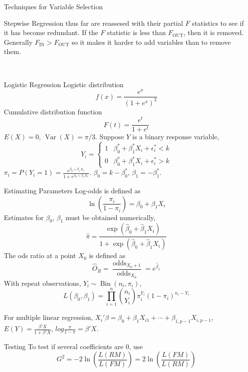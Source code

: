 \documentclass{article}
\DeclareMathOperator{\Var}{Var}
\DeclareMathOperator{\Bin}{Bin}
\DeclareMathOperator{\fin}{IN}
\DeclareMathOperator{\fout}{OUT}
\DeclareMathOperator{\odds}{odds}
\begin{document}
\begin{multicols*}{3}
\begin{blackbox}{Techniques for Variable Selection}
\begin{pinkbox}{Stepwise Regression}
                thus far are reassesed with their partial $F$ statistics to see if it has become redundant. If the $F$ statistic is less than $F_{\fout}$, then it is removed. Generally $F_{\fin} > F_{\fout}$ so it makes it harder to add variables than to remove them.
            \end{pinkbox}\\[-2ex]
        \end{blackbox}
        \begin{blackbox}{Logistic Regression}
            Logistic distribution
            \[f(x) = \frac{e^x}{(1+e^{x})^2}\]            
            Cumulative distribution function
            \[F(t) = \frac{e^t}{1+e^t}\]
            $E(X) = 0$, $\Var(X) = \pi/3$. Suppose $Y$ is a binary response variable,
            \[Y_i = \begin{cases}
                1 & \beta^*_0 + \beta^*_1X_i + \epsilon^*_i < k\\
                0 & \beta^*_0 + \beta^*_1X_i + \epsilon^*_i > k
            \end{cases}\]
            $\pi_i = P(Y_i = 1) = \frac{e^{\beta_0 + \beta_1X_1}}{1 + e^{\beta_0 + \beta_1X_1}}$. $\beta_0 = k - \beta_0^*$, $\beta_1 = -\beta_1^*$.
            \begin{bluebox}{Estimating Parameters}
                Log-odds is defined as \\[-2ex]
                \[\ln\left(\frac{\pi_i}{1-\pi_i}\right) = \beta_0 + \beta_1 X_i\]
                Estimates for $\beta_0$, $\beta_1$ must be obtained numerically, 
                \[\hat{\pi} = \frac{\exp(\hat{\beta}_0 + \hat{\beta}_1X_i)}{1 + \exp(\hat{\beta}_0 + \hat{\beta}_1X_i)}\]
                The ods ratio at a point $X_0$ is defined as 
                \[\hat{O}_R = \frac{\odds_{X_0+1}}{\odds_{X_0}} = e^{\hat{\beta}_1}\]
                With repeat observations, $Y_i \sim \Bin(n_i,\pi_i)$, 
                \[L(\beta_0, \beta_1) = \prod_{i=1}^n {n_i \choose Y_i} \pi_i^{Y_i}(1-\pi_i)^{n_i - Y_i}\]
            \end{bluebox}
            For multiple linear regression, $X_i'\beta = \beta_0 + \beta_1X_{i1} + \cdots + \beta_{1,p-1}X_{i,p-1}$, $E(Y) = \frac{\beta'X}{1 + \beta'X}$, $log\frac{\pi}{1-\pi} = \beta'X$.
            \begin{brownbox}{Testing}
                To test if several coefficients are 0, use
                \[G^2 = -2\ln \left(\frac{L(RM)}{L(FM)}\right) = 2\ln \left(\frac{L(FM)}{L(RM)}\right)\]
            \end{brownbox}
        \end{blackbox}
    \end{multicols*}
    
\end{document}
